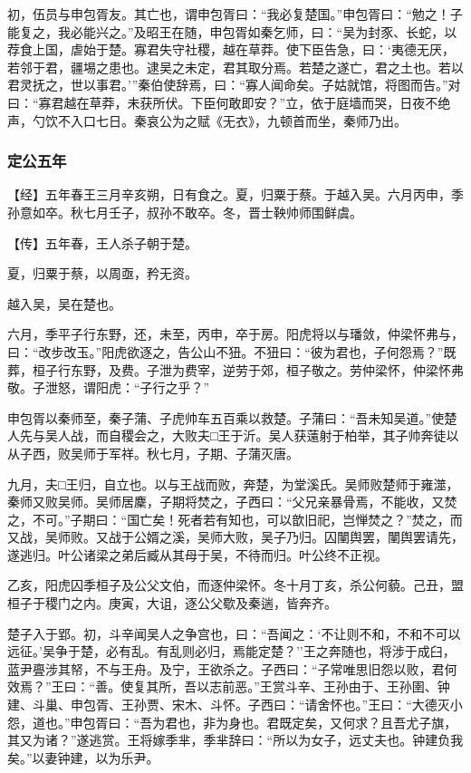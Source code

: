 \documentclass[]{article}
\begin{document}
初，伍员与申包胥友。其亡也，谓申包胥曰：``我必复楚国。''申包胥曰：``勉之！子能复之，我必能兴之。''及昭王在随，申包胥如秦乞师，曰：``吴为封豕、长蛇，以荐食上国，虐始于楚。寡君失守社稷，越在草莽。使下臣告急，曰：`夷德无厌，若邻于君，疆埸之患也。逮吴之未定，君其取分焉。若楚之遂亡，君之土也。若以君灵抚之，世以事君。'''秦伯使辞焉，曰：``寡人闻命矣。子姑就馆，将图而告。''对曰：``寡君越在草莽，未获所伏。下臣何敢即安？''立，依于庭墙而哭，日夜不绝声，勺饮不入口七日。秦哀公为之赋《无衣》，九顿首而坐，秦师乃出。

\hypertarget{header-n2919}{%
\subsubsection{定公五年}\label{header-n2919}}

【经】五年春王三月辛亥朔，日有食之。夏，归粟于蔡。于越入吴。六月丙申，季孙意如卒。秋七月壬子，叔孙不敢卒。冬，晋士鞅帅师围鲜虞。

【传】五年春，王人杀子朝于楚。

夏，归粟于蔡，以周亟，矜无资。

越入吴，吴在楚也。

六月，季平子行东野，还，未至，丙申，卒于房。阳虎将以与璠敛，仲梁怀弗与，曰：``改步改玉。''阳虎欲逐之，告公山不狃。不狃曰：``彼为君也，子何怨焉？''既葬，桓子行东野，及费。子泄为费宰，逆劳于郊，桓子敬之。劳仲梁怀，仲梁怀弗敬。子泄怒，谓阳虎：``子行之乎？''

申包胥以秦师至，秦子蒲、子虎帅车五百乘以救楚。子蒲曰：``吾未知吴道。''使楚人先与吴人战，而自稷会之，大败夫□王于沂。吴人获薳射于柏举，其子帅奔徒以从子西，败吴师于军祥。秋七月，子期、子蒲灭唐。

九月，夫□王归，自立也。以与王战而败，奔楚，为堂溪氏。吴师败楚师于雍澨，秦师又败吴师。吴师居麇，子期将焚之，子西曰：``父兄亲暴骨焉，不能收，又焚之，不可。''子期曰：``国亡矣！死者若有知也，可以歆旧祀，岂惮焚之？''焚之，而又战，吴师败。又战于公婿之溪，吴师大败，吴子乃归。囚闉舆罢，闉舆罢请先，遂逃归。叶公诸梁之弟后臧从其母于吴，不待而归。叶公终不正视。

乙亥，阳虎囚季桓子及公父文伯，而逐仲梁怀。冬十月丁亥，杀公何藐。己丑，盟桓子于稷门之内。庚寅，大诅，逐公父歜及秦遄，皆奔齐。

楚子入于郢。初，斗辛闻吴人之争宫也，曰：``吾闻之：`不让则不和，不和不可以远征。'吴争于楚，必有乱。有乱则必归，焉能定楚？''王之奔随也，将涉于成臼，蓝尹亹涉其帑，不与王舟。及宁，王欲杀之。子西曰：``子常唯思旧怨以败，君何效焉？''王曰：``善。使复其所，吾以志前恶。''王赏斗辛、王孙由于、王孙圉、钟建、斗巢、申包胥、王孙贾、宋木、斗怀。子西曰：``请舍怀也。''王曰：``大德灭小怨，道也。''申包胥曰：``吾为君也，非为身也。君既定矣，又何求？且吾尤子旗，其又为诸？''遂逃赏。王将嫁季芈，季芈辞曰：``所以为女子，远丈夫也。钟建负我矣。''以妻钟建，以为乐尹。
\end{document}
